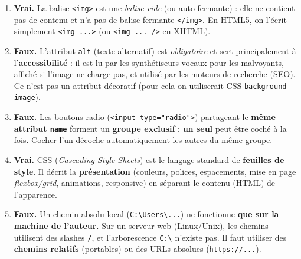 \documentclass[11pt]{article}
\begin{document}
\begin{corrige}
\begin{enumerate}
  \item \textbf{Vrai.} La balise \texttt{<img>} est une \emph{balise vide} (ou auto-fermante) : elle ne contient pas de contenu et n'a pas de balise fermante \texttt{</img>}. En HTML5, on l'écrit simplement \texttt{<img ...>} (ou \texttt{<img ... />} en XHTML).
  
  \item \textbf{Faux.} L'attribut \texttt{alt} (texte alternatif) est \emph{obligatoire} et sert principalement à l'\textbf{accessibilité} : il est lu par les synthétiseurs vocaux pour les malvoyants, affiché si l'image ne charge pas, et utilisé par les moteurs de recherche (SEO). Ce n'est pas un attribut décoratif (pour cela on utiliserait CSS \texttt{background-image}).
  
  \item \textbf{Faux.} Les boutons radio (\texttt{<input type="radio">}) partageant le \textbf{même attribut \texttt{name}} forment un \textbf{groupe exclusif} : \textbf{un seul} peut être coché à la fois. Cocher l'un décoche automatiquement les autres du même groupe.
  
  \item \textbf{Vrai.} CSS (\emph{Cascading Style Sheets}) est le langage standard de \textbf{feuilles de style}. Il décrit la \textbf{présentation} (couleurs, polices, espacements, mise en page \emph{flexbox/grid}, animations, responsive) en séparant le contenu (HTML) de l'apparence.
  
  \item \textbf{Faux.} Un chemin absolu local (\texttt{C:\textbackslash Users\textbackslash ...}) ne fonctionne \textbf{que sur la machine de l'auteur}. Sur un serveur web (Linux/Unix), les chemins utilisent des slashes \texttt{/}, et l'arborescence \texttt{C:\textbackslash} n'existe pas. Il faut utiliser des \textbf{chemins relatifs} (portables) ou des URLs absolues (\texttt{https://...}).
\end{enumerate}
\end{corrige}
\end{document}

